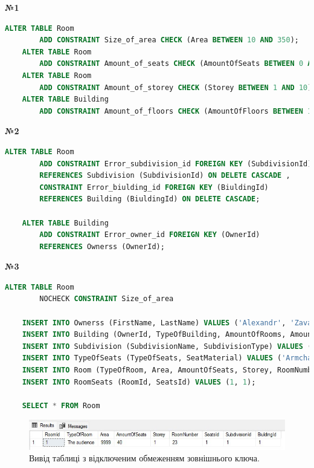 \documentclass[a4paper,12pt]{article}
\begin{document}
\newpage
	\begin{center}
		\textbf{№1}
	\end{center}
	\begin{lstlisting}[language=SQL]
	ALTER TABLE Room
		ADD CONSTRAINT Size_of_area CHECK (Area BETWEEN 10 AND 350);
	ALTER TABLE Room
		ADD CONSTRAINT Amount_of_seats CHECK (AmountOfSeats BETWEEN 0 AND 200);
	ALTER TABLE Room
		ADD CONSTRAINT Amount_of_storey CHECK (Storey BETWEEN 1 AND 10);
	ALTER TABLE Building
		ADD CONSTRAINT Amount_of_floors CHECK (AmountOfFloors BETWEEN 1 AND 10);
	\end{lstlisting}
	\begin{center}
		\textbf{№2}
	\end{center}
	\begin{lstlisting}[language=SQL]
	ALTER TABLE Room
		ADD CONSTRAINT Error_subdivision_id FOREIGN KEY (SubdivisionId) 
		REFERENCES Subdivision (SubdivisionId) ON DELETE CASCADE ,
		CONSTRAINT Error_biulding_id FOREIGN KEY (BiuldingId) 
		REFERENCES Building (BiuldingId) ON DELETE CASCADE;
	
	ALTER TABLE Building
		ADD CONSTRAINT Error_owner_id FOREIGN KEY (OwnerId) 
		REFERENCES Ownerss (OwnerId);
	\end{lstlisting}
	\begin{center}
		\textbf{№3}
	\end{center}
	\begin{lstlisting}[language=SQL]
	ALTER TABLE Room
		NOCHECK CONSTRAINT Size_of_area
	
	INSERT INTO Ownerss (FirstName, LastName) VALUES ('Alexandr', 'Zavalii');
	INSERT INTO Building (OwnerId, TypeOfBuilding, AmountOfRooms, AmountOfFloors) VALUES (1, 'Enterprise', 30, 3);
	INSERT INTO Subdivision (SubdivisionName, SubdivisionType) VALUES ('Lab', 'Chemical');
	INSERT INTO TypeOfSeats (TypeOfSeats, SeatMaterial) VALUES ('Armchairs','Leather');
	INSERT INTO Room (TypeOfRoom, Area, AmountOfSeats, Storey, RoomNumber, SeatsId, SubdivisionId, BiuldingId) VALUES ('The audience', 9999, 40, 1, 23, 1, 1, 1);
	INSERT INTO RoomSeats (RoomId, SeatsId) VALUES (1, 1);
	
	SELECT * FROM Room
	\end{lstlisting}
	\begin{figure}[h!]
		\centering
		\begin{minipage}[h]{1\linewidth}
			\includegraphics[width=1\linewidth]{Prt sc/Figure_1.jpg}  
		\end{minipage}
		\caption{Вивід таблиці з відключеним обмеженням зовнішнього ключа.}
	\end{figure}
\end{document}
